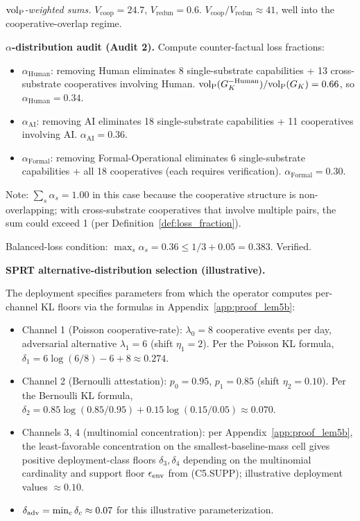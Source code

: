\emph{${\operatorname{vol}_{\mathrm{P}}}$-weighted sums.}  $V_{\mathrm{coop}} = 24.7$,
$V_{\mathrm{redun}} = 0.6$. $V_{\mathrm{coop}} / V_{\mathrm{redun}}
\approx 41$, well into the cooperative-overlap regime.

\textbf{$\alpha$-distribution audit (Audit 2).}  Compute counter-factual loss fractions:

\begin{itemize}
\item $\alpha_{\mathrm{Human}}$: removing Human eliminates 8
  single-substrate capabilities + 13 cross-substrate cooperatives
  involving Human. ${\operatorname{vol}_{\mathrm{P}}}(G_K^{-\mathrm{Human}}) / {\operatorname{vol}_{\mathrm{P}}}(G_K) =
  0.66$, so $\alpha_{\mathrm{Human}} = 0.34$.
\item $\alpha_{\mathrm{AI}}$: removing AI eliminates 18
  single-substrate capabilities + 11 cooperatives involving AI.
  $\alpha_{\mathrm{AI}} = 0.36$.
\item $\alpha_{\mathrm{Formal}}$: removing Formal-Operational
  eliminates 6 single-substrate capabilities + all 18 cooperatives
  (each requires verification). $\alpha_{\mathrm{Formal}} = 0.30$.
\end{itemize}

Note: $\sum_s \alpha_s = 1.00$ in this case because the cooperative
structure is non-overlapping; with cross-substrate cooperatives that
involve multiple pairs, the sum could exceed 1 (per
Definition~\ref{def:loss_fraction}).

Balanced-loss condition: $\max_s \alpha_s = 0.36 \leq 1/3 + 0.05 =
0.383$. Verified.

\textbf{SPRT alternative-distribution selection
(illustrative).}

The deployment specifies parameters from which the operator
computes per-channel KL floors via the formulas in
Appendix~\ref{app:proof_lem5b}:
\begin{itemize}
\item Channel 1 (Poisson cooperative-rate): $\lambda_0 = 8$
  cooperative events per day, adversarial alternative $\lambda_1 =
  6$ (shift $\eta_1 = 2$).  Per the Poisson KL formula,
  $\delta_1 = 6 \log(6/8) - 6 + 8 \approx 0.274$.
\item Channel 2 (Bernoulli attestation): $p_0 = 0.95$, $p_1 = 0.85$
  (shift $\eta_2 = 0.10$).  Per the Bernoulli KL formula,
  $\delta_2 = 0.85 \log(0.85/0.95) + 0.15 \log(0.15/0.05) \approx
  0.070$.
\item Channels 3, 4 (multinomial concentration): per
  Appendix~\ref{app:proof_lem5b}, the least-favorable
  concentration on the smallest-baseline-mass cell gives positive
  deployment-class floors $\delta_3, \delta_4$ depending on the
  multinomial cardinality and support floor $\epsilon_{\mathrm{env}}$ from
  (C5.SUPP); illustrative deployment values $\approx 0.10$.
\item $\delta_{\mathrm{adv}} = \min_c \delta_c \approx 0.07$ for this
  illustrative parameterization.
\end{itemize}

